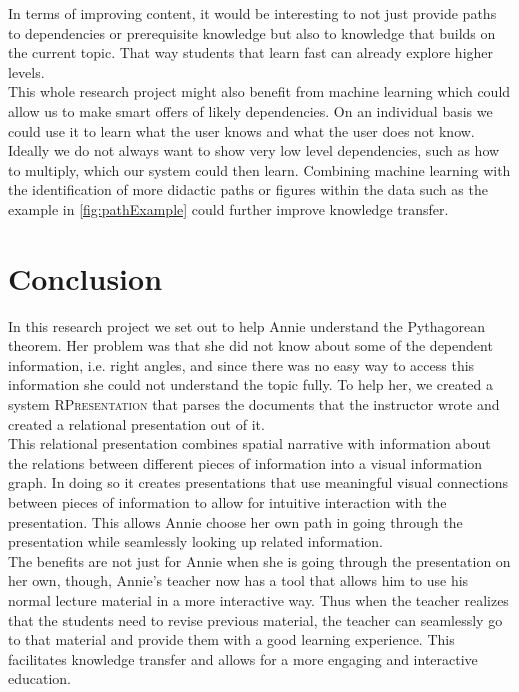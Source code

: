 \documentclass[twoside, 12pt]{article}
\newcommand{\sys}{\textsc{RPresentation}\xspace}
\begin{document}
In terms of improving content, it would be interesting to not just provide paths to dependencies or prerequisite knowledge but also to knowledge that builds on the current topic. That way students that learn fast can already explore higher levels.\\

This whole research project might also benefit from machine learning which could allow us to make smart offers of likely dependencies. On an individual basis we could use it to learn what the user knows and what the user does not know. Ideally we do not always want to show very low level dependencies, such as how to multiply, which our system could then learn. Combining machine learning with the identification of more didactic paths or figures within the data such as the example in \autoref{fig:pathExample} could further improve knowledge transfer.

\section{Conclusion}
\label{sec:conclusion}

In this research project we set out to help Annie understand the Pythagorean theorem. Her problem was that she did not know about some of the dependent information, i.e. right angles, and since there was no easy way to access this information she could not understand the topic fully. To help her, we created a system \sys that parses the documents that the instructor wrote and created a relational presentation out of it.\\

This relational presentation combines spatial narrative with information about the relations between different pieces of information into a visual information graph. In doing so it creates presentations that use meaningful visual connections between pieces of information to allow for intuitive interaction with the presentation. This allows Annie choose her own path in going through the presentation while seamlessly looking up related information.\\

The benefits are not just for Annie when she is going through the presentation on her own, though, Annie's teacher now has a tool that allows him to use his normal lecture material in a more interactive way. Thus when the teacher realizes that the students need to revise previous material, the teacher can seamlessly go to that material and provide them with a good learning experience. This facilitates knowledge transfer and allows for a more engaging and interactive education.\\
\end{document}
